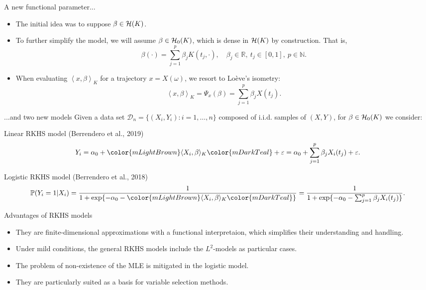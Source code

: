 \documentclass[10pt, english, professionalfonts]{beamer}
\newcommand\maroon[1]{\color{mLightBrown}#1\color{mDarkTeal}}
\newcommand{\N}{\mathbb{N}}
\newcommand{\R}{\mathbb{R}}
\newcommand{\Hcal}{\ensuremath\mathcal{H}}
\newcommand\dotprod[2]{\left\langle #1, #2 \right\rangle}
\begin{document}
\begin{frame}{A new functional parameter...}
  \begin{itemize}
    \item The initial idea was to suppose \(\beta \in \Hcal(K)\).
    \item To further simplify the model, we will assume \(\beta \in \Hcal_0(K)\), which is dense in \(\Hcal(K)\) by construction. That is,
    \[
      \beta(\cdot) = \sum_{j=1}^p \beta_j K(t_j, \cdot), \quad \beta_j \in \R, \ t_j \in [0, 1], \ p \in \N.
    \]
    \item When evaluating \(\dotprod{x}{\beta}_K\) for a trajectory \(x=X(\omega)\), we resort to Loève's isometry:
    \[
      \dotprod{x}{\beta}_K = \Psi_x(\beta) = \sum_{j=1}^p \beta_j X(t_j).
    \]
  \end{itemize}

\end{frame}


\begin{frame}{...and two new models}
  Given a data set \(\mathcal D_n = \{(X_i, Y_i): i=1,\dots, n\}\) composed of i.i.d. samples of \((X, Y)\), for \(\beta \in \Hcal_0(K)\) we consider:

  \vspace{1em}

  \begin{block}{Linear RKHS model (Berrendero et al., 2019)}
  \[
    Y_i = \alpha_0 + \maroon{\langle X_i, \beta \rangle_K} + \varepsilon = \alpha_0 + \sum_{j=1}^p \beta_j X_i(t_j) + \varepsilon.
  \]
\end{block}
\vspace{1em}

\begin{block}{Logistic RKHS model (Berrendero et al., 2018)}
    \[
    \mathbb P (Y_i=1| X_i) = \frac{1}{1 + \exp\{-\alpha_0 - \maroon{\langle X_i, \beta\rangle_K}\}} = \frac{1}{1 + \exp\{-\alpha_0 - \sum_{j=1}^p \beta_j X_i(t_j)\}}.
  \]
\end{block}

\end{frame}

\begin{frame}{Advantages of RKHS models}
  \begin{itemize}
    \item They are finite-dimensional approximations with a functional interpretaion, which simplifies their understanding and handling.
    \item Under mild conditions, the general RKHS models include the \(L^2\)-models as particular cases.
    \item The problem of non-existence of the MLE is mitigated in the logistic model.
    \item They are particularly suited as a basis for variable selection methods.
  \end{itemize}
\end{frame}
\end{document}
